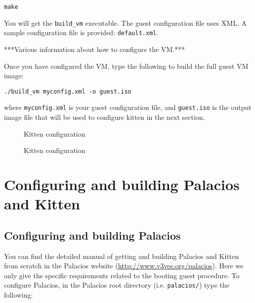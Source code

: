 \documentclass{article}[11pt]
\def\colfigsize{\epsfxsize=5in}
\begin{document}
\begin{verbatim}
make
\end{verbatim}

\vspace{10pt}
\noindent
You will get the \verb|build_vm| executable. The guest configuration file uses
XML. A sample configuration file is provided: \verb|default.xml|.

\vspace{5pt}
\noindent
***Various information about how to configure the VM.***

\vspace{5pt}
\noindent
Once you have configured the VM, type the following to build the full guest VM
image:
\begin{verbatim}
./build_vm myconfig.xml -o guest.iso
\end{verbatim}
where \verb+myconfig.xml+ is your guest configuration file, and \verb+guest.iso+
is the output image file that will be used to configure kitten in the next
section.




\pagebreak
\begin{figure}[h]
  \begin{center}
    \colfigsize{}
  \end{center}
  \caption{Kitten configuration}
  \label{fig:kittencf}
\end{figure}

\begin{figure}[h]
  \begin{center}
    \colfigsize{}
  \end{center}
  \caption{Kitten configuration}
  \label{fig:kittencf2}
\end{figure}


\section{Configuring and building Palacios and Kitten}
\subsection*{Configuring and building Palacios}

You can find the detailed manual of getting and building Palacios and Kitten 
from scratch in the Palacios website (\url{http://www.v3vee.org/palacios}). Here
we only give the specific requirements related to the booting guest procedure.
To configure Palacios, in the Palacios root directory (i.e. \verb+palacios/+)
type the following:
\end{document}
